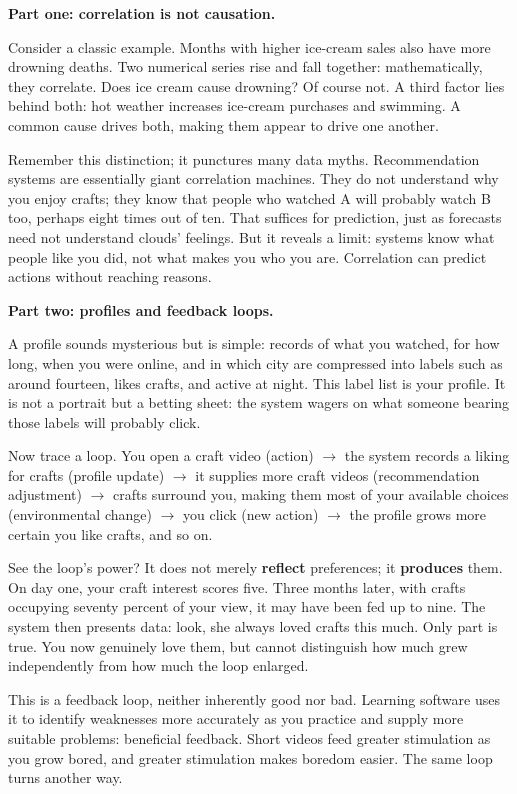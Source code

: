 \textbf{Part one: correlation is not causation.}

Consider a classic example. Months with higher ice-cream sales also have more drowning deaths. Two numerical series rise and fall together: mathematically, they correlate. Does ice cream cause drowning? Of course not. A third factor lies behind both: hot weather increases ice-cream purchases and swimming. A common cause drives both, making them appear to drive one another.

Remember this distinction; it punctures many data myths. Recommendation systems are essentially giant correlation machines. They do not understand why you enjoy crafts; they know that people who watched A will probably watch B too, perhaps eight times out of ten. That suffices for prediction, just as forecasts need not understand clouds' feelings. But it reveals a limit: systems know what people like you did, not what makes you who you are. Correlation can predict actions without reaching reasons.

\textbf{Part two: profiles and feedback loops.}

A profile sounds mysterious but is simple: records of what you watched, for how long, when you were online, and in which city are compressed into labels such as around fourteen, likes crafts, and active at night. This label list is your profile. It is not a portrait but a betting sheet: the system wagers on what someone bearing those labels will probably click.

Now trace a loop. You open a craft video (action) $\rightarrow$ the system records a liking for crafts (profile update) $\rightarrow$ it supplies more craft videos (recommendation adjustment) $\rightarrow$ crafts surround you, making them most of your available choices (environmental change) $\rightarrow$ you click (new action) $\rightarrow$ the profile grows more certain you like crafts, and so on.

See the loop's power? It does not merely \textbf{reflect} preferences; it \textbf{produces} them. On day one, your craft interest scores five. Three months later, with crafts occupying seventy percent of your view, it may have been fed up to nine. The system then presents data: look, she always loved crafts this much. Only part is true. You now genuinely love them, but cannot distinguish how much grew independently from how much the loop enlarged.

This is a feedback loop, neither inherently good nor bad. Learning software uses it to identify weaknesses more accurately as you practice and supply more suitable problems: beneficial feedback. Short videos feed greater stimulation as you grow bored, and greater stimulation makes boredom easier. The same loop turns another way.

